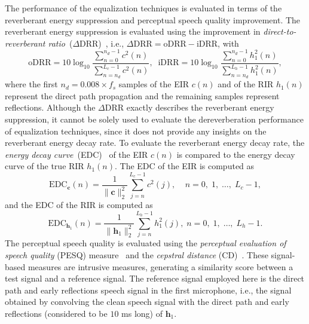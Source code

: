 \documentclass[10pt]{IEEEtran}
\begin{document}
The performance of the equalization techniques is evaluated in terms of the reverberant energy suppression and perceptual speech quality improvement. 
The reverberant energy suppression is evaluated using the improvement in {\textit{direct-to-reverberant ratio}}~($\Delta$DRR)~\cite{Naylor_Derev_book}, i.e., $\Delta {\text{DRR}} = {\text{oDRR}} - {\text{iDRR}}$, with
\begin{equation}
{\text{oDRR}}\!\! = \!\!10 \log_{10} \frac{\sum\limits_{n=0}^{n_d-1} c^2(n)}{\sum\limits_{n=n_d}^{L_c-1} c^2(n)}, \; \; {\text{iDRR}}\!\! = \!\!10 \log_{10} \frac{\sum\limits_{n=0}^{n_d-1} h_1^2(n)}{\sum\limits_{n=n_d}^{L_h-1} h_1^2(n)},
\end{equation}
where the first $n_d = 0.008 \times f_s$ samples of the EIR $c(n)$ and of the RIR $h_1(n)$ represent the direct path propagation and the remaining samples represent reflections.
Although the $\Delta$DRR exactly describes the reverberant energy suppression, it cannot be solely used to evaluate the dereverberation performance of equalization techniques, since it does not provide any insights on the reverberant energy decay rate.
To evaluate the reverberant energy decay rate, the {\textit{energy decay curve}}~(EDC)~\cite{Schoreder_JASA_1965} of the EIR $c(n)$ is compared to the energy decay curve of the true RIR $h_1(n)$.
The EDC of the EIR is computed as
\begin{equation}
\label{eq: edc}
{\text{EDC}}_{\mathbf{c}}(n) = \frac{1}{\| \mathbf{c} \|_2^2} \sum_{j=n}^{L_c-1}c^2(j), \; \; \; \; n = 0, \; 1, \; \ldots, \; L_c-1,
\end{equation}
and the EDC of the RIR is computed as
\begin{equation}
{\text{EDC}}_{\mathbf{h}_1}(n) = \frac{1}{\| \mathbf{h}_1 \|_2^2} \!\!\!\sum_{j=n}^{L_h-1}h_1^2(j), \; n = 0, \; 1, \; \ldots, \; L_h-1.
\end{equation}
The perceptual speech quality is evaluated using the {\textit{perceptual evaluation of speech quality}} (PESQ) measure~\cite{PESQ} and the {\textit{cepstral distance}} (CD)~\cite{Quackenbush_book}.
These signal-based measures are intrusive measures, generating a similarity score between a test signal and a reference signal.
The reference signal employed here is the direct path and early reflections speech signal in the first microphone, i.e., the signal obtained by convolving the clean speech signal with the direct path and early reflections (considered to be $10$ ms long) of $\mathbf{h}_1$.
\end{document}
